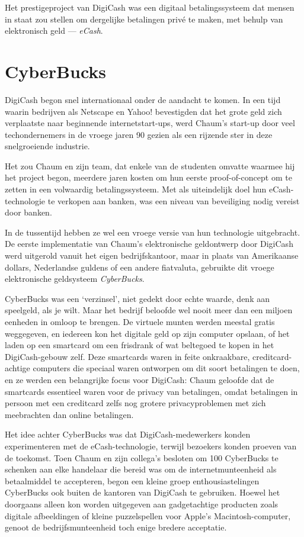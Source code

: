 \documentclass[
  a5paper,
  smalldemyvopaper,11pt,twoside,onecolumn,openright,extrafontsizes]{memoir}
\begin{document}
Het prestigeproject van DigiCash was een digitaal betalingssysteem dat
mensen in staat zou stellen om dergelijke betalingen privé te maken, met
behulp van elektronisch geld --- \emph{eCash}.

\section{CyberBucks}\label{cyberbucks}

DigiCash begon snel internationaal onder de aandacht te komen. In een
tijd waarin bedrijven als Netscape en Yahoo! bevestigden dat het grote
geld zich verplaatste naar beginnende internetstart-ups, werd Chaum's
start-up door veel techondernemers in de vroege jaren 90 gezien als een
rijzende ster in deze snelgroeiende industrie.

Het zou Chaum en zijn team, dat enkele van de studenten omvatte waarmee
hij het project begon, meerdere jaren kosten om hun eerste
proof-of-concept om te zetten in een volwaardig betalingssysteem. Met
als uiteindelijk doel hun eCash-technologie te verkopen aan banken, was
een niveau van beveiliging nodig vereist door banken.

In de tussentijd hebben ze wel een vroege versie van hun technologie
uitgebracht. De eerste implementatie van Chaum's elektronische
geldontwerp door DigiCash werd uitgerold vanuit het eigen
bedrijfskantoor, maar in plaats van Amerikaanse dollars, Nederlandse
guldens of een andere fiatvaluta, gebruikte dit vroege elektronische
geldsysteem \emph{CyberBucks}.

CyberBucks was een `verzinsel', niet gedekt door echte waarde, denk aan
speelgeld, als je wilt. Maar het bedrijf beloofde wel nooit meer dan een
miljoen eenheden in omloop te brengen. De virtuele munten werden meestal
gratis weggegeven, en iedereen kon het digitale geld op zijn computer
opslaan, of het laden op een smartcard om een frisdrank of wat beltegoed
te kopen in het DigiCash-gebouw zelf. Deze smartcards waren in feite
onkraakbare, creditcard-achtige computers die speciaal waren ontworpen
om dit soort betalingen te doen, en ze werden een belangrijke focus voor
DigiCash: Chaum geloofde dat de smartcards essentieel waren voor de
privacy van betalingen, omdat betalingen in persoon met een creditcard
zelfs nog grotere privacyproblemen met zich meebrachten dan online
betalingen.

Het idee achter CyberBucks was dat DigiCash-medewerkers konden
experimenteren met de eCash-technologie, terwijl bezoekers konden
proeven van de toekomst. Toen Chaum en zijn collega's besloten om 100
CyberBucks te schenken aan elke handelaar die bereid was om de
internetmunteenheid als betaalmiddel te accepteren, begon een kleine
groep enthousiastelingen CyberBucks ook buiten de kantoren van DigiCash
te gebruiken. Hoewel het doorgaans alleen kon worden uitgegeven aan
gadgetachtige producten zoals digitale afbeeldingen of kleine
puzzelspellen voor Apple's Macintosh-computer, genoot de
bedrijfsmunteenheid toch enige bredere acceptatie.
\end{document}
